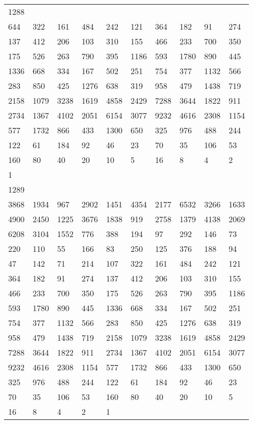 \begin{longtable}{*{10}{l}}
1288&&&&&&&&&\\
644& 322& 161& 484& 242& 121& 364& 182& 91& 274\\
137& 412& 206& 103& 310& 155& 466& 233& 700& 350\\
175& 526& 263& 790& 395& 1186& 593& 1780& 890& 445\\
1336& 668& 334& 167& 502& 251& 754& 377& 1132& 566\\
283& 850& 425& 1276& 638& 319& 958& 479& 1438& 719\\
2158& 1079& 3238& 1619& 4858& 2429& 7288& 3644& 1822& 911\\
2734& 1367& 4102& 2051& 6154& 3077& 9232& 4616& 2308& 1154\\
577& 1732& 866& 433& 1300& 650& 325& 976& 488& 244\\
122& 61& 184& 92& 46& 23& 70& 35& 106& 53\\
160& 80& 40& 20& 10& 5& 16& 8& 4& 2\\
1& \\

1289&&&&&&&&&\\
3868& 1934& 967& 2902& 1451& 4354& 2177& 6532& 3266& 1633\\
4900& 2450& 1225& 3676& 1838& 919& 2758& 1379& 4138& 2069\\
6208& 3104& 1552& 776& 388& 194& 97& 292& 146& 73\\
220& 110& 55& 166& 83& 250& 125& 376& 188& 94\\
47& 142& 71& 214& 107& 322& 161& 484& 242& 121\\
364& 182& 91& 274& 137& 412& 206& 103& 310& 155\\
466& 233& 700& 350& 175& 526& 263& 790& 395& 1186\\
593& 1780& 890& 445& 1336& 668& 334& 167& 502& 251\\
754& 377& 1132& 566& 283& 850& 425& 1276& 638& 319\\
958& 479& 1438& 719& 2158& 1079& 3238& 1619& 4858& 2429\\
7288& 3644& 1822& 911& 2734& 1367& 4102& 2051& 6154& 3077\\
9232& 4616& 2308& 1154& 577& 1732& 866& 433& 1300& 650\\
325& 976& 488& 244& 122& 61& 184& 92& 46& 23\\
70& 35& 106& 53& 160& 80& 40& 20& 10& 5\\
16& 8& 4& 2& 1& \\


\end{longtable}
